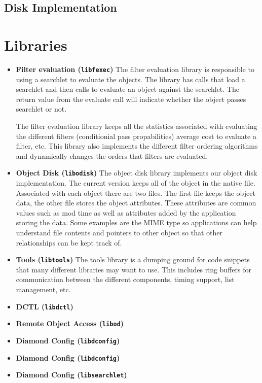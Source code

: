 \documentclass{article}
\begin{document}
\subsection{Disk Implementation}



\section{Libraries}

\begin{itemize}

\item
\textbf{Filter evaluation (\texttt{libfexec})}
The filter evaluation library is responsible to using a searchlet
to evaluate the objects.  The library has calls that load a searchlet
and then calls to evaluate an object against the searchlet.  The 
return value from the evaluate call will indicate whether the object
passes searchlet or not.

The filter evaluation library keeps all the statistics associated
with evaluating the different filters (conditionial pass propabilities)
average cost to evaluate a filter, etc.   This library also
implements the different filter ordering algorithms and dynamically
changes the orders that filters are evaluated. 

\item
\textbf{Object Disk (\texttt{libodisk})}
The object disk library implements our object disk implementation.
The current version keeps all of the object in the native file.
Associated with each object there are two files.  The first file
keeps the object data, the other file stores the object attributes.
These attributes are common values such as mod time as well as
attributes added by the application storing the data.  Some examples
are the MIME type so applications can help understand file contents
and pointers to other object so that other relationships can
be kept track of.

\item
\textbf{Tools (\texttt{libtools})}
The tools library is a dumping ground for code snippets that
many different libraries may want to use.  This includes ring
buffers for communication between the different components, timing
support, list management, etc. 

\item
\textbf{DCTL (\texttt{libdctl})}


\item
\textbf{Remote Object Access (\texttt{libod})}

\item
\textbf{Diamond Config (\texttt{libdconfig})}

\item
\textbf{Diamond Config (\texttt{libdconfig})}

\item
\textbf{Diamond Config (\texttt{libsearchlet})}


\end{itemize}
\end{document}

